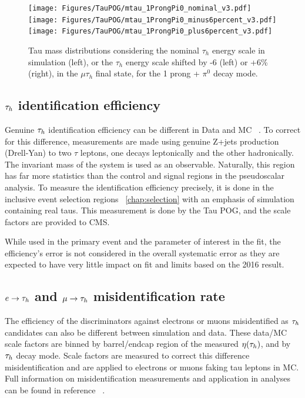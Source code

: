 \begin{figure}[h!]
    \begin{center}
        \texttt{[image: Figures/TauPOG/mtau\_1ProngPi0\_nominal\_v3.pdf]}
        \texttt{[image: Figures/TauPOG/mtau\_1ProngPi0\_minus6percent\_v3.pdf]}
        \texttt{[image: Figures/TauPOG/mtau\_1ProngPi0\_plus6percent\_v3.pdf]}
    \end{center}
    \caption{Tau mass distributions considering the nominal $\tau_h$ energy scale in simulation (left), or the $\tau_h$ energy scale shifted by -6 (left) or +6\% (right), in the $\mu\tau_h$ final state, for the 1 prong + $\pi^0$ decay mode.}
    \label{fig:taues}
\end{figure}

\subsection{$\tau_h$ identification efficiency}

Genuine $\tau_h$ identification efficiency can be different in Data and MC ~\cite{TAUIDTwiki}. To correct for this difference, measurements are 
made using genuine Z+jets production (Drell-Yan) to two $\tau$ leptons, one decays leptonically and the other hadronically. The invariant mass of the system is used as an observable. Naturally, this region has far more statistics than the control and signal regions in the pseudoscalar analysis. To measure the identification efficiency precisely, it is done in the inclusive event selection regions ~\ref{chap:selection} with an emphasis of simulation containing real taus. This measurement is done by the Tau POG, and the scale factors are provided to CMS. 

While used in the primary event and the parameter of interest in the fit, the efficiency's error is not considered in the overall systematic error as they are expected to have very little impact on fit and limits based on the 2016 result. 


\subsection{$e \rightarrow \tau_h$  and $\mu \rightarrow \tau_h$ misidentification rate}
The efficiency of the discriminators against electrons or muons misidentified as $\tau_h$ candidates can also be different between simulation and data. 
These data/MC scale factors are
binned by barrel/endcap region of the measured $\eta(\tau_h)$, and by $\tau_h$ decay mode.
Scale factors are measured to correct this difference misidentification and are applied to electrons or muons faking tau leptons in MC. 
Full information on misidentification measurements and application in analyses can be found in reference ~\cite{TAUIDTwiki}. 


